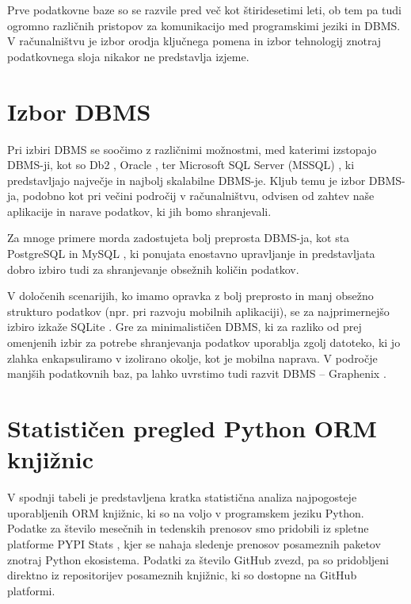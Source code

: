\documentclass[a4paper,12pt,openright]{book}
\begin{document}
    Prve podatkovne baze so se razvile pred več kot štiridesetimi leti, ob tem pa tudi ogromno različnih pristopov za komunikacijo med programskimi jeziki in DBMS. V računalništvu je izbor orodja ključnega pomena in izbor tehnologij znotraj podatkovnega sloja nikakor ne predstavlja izjeme.

    \section{Izbor DBMS}
    Pri izbiri DBMS se soočimo z različnimi možnostmi, med katerimi izstopajo DBMS-ji, kot so Db2 \cite{DB2}, Oracle \cite{ORACLE}, ter Microsoft SQL Server (MSSQL) \cite{MSSQL}, ki predstavljajo največje in najbolj skalabilne DBMS-je. Kljub temu je izbor DBMS-ja, podobno kot pri večini področij v računalništvu, odvisen od zahtev naše aplikacije in narave podatkov, ki jih bomo shranjevali.

    Za mnoge primere morda zadostujeta bolj preprosta DBMS-ja, kot sta PostgreSQL \cite{POSTGRESQL} in MySQL \cite{MYSQL}, ki ponujata enostavno upravljanje in predstavljata dobro izbiro tudi za shranjevanje obsežnih količin podatkov. 
    
    V določenih scenarijih, ko imamo opravka z bolj preprosto in manj obsežno strukturo podatkov (npr. pri razvoju mobilnih aplikaciji), se za najprimernejšo izbiro izkaže SQLite \cite{SQLITE}. Gre za minimalističen DBMS, ki za razliko od prej omenjenih izbir za potrebe shranjevanja podatkov uporablja zgolj datoteko, ki jo zlahka enkapsuliramo v izolirano okolje, kot je mobilna naprava. V področje manjših podatkovnih baz, pa lahko uvrstimo tudi razvit DBMS – Graphenix \cite{GRAPHENIX_GITHUB}.
    
    \section{Statističen pregled Python ORM knjižnic}

    V spodnji tabeli je predstavljena kratka statistična analiza najpogosteje uporabljenih ORM knjižnic, ki so na voljo v programskem jeziku Python. Podatke za število mesečnih in tedenskih prenosov smo pridobili iz spletne platforme PYPI Stats \cite{pypistats}, kjer se nahaja sledenje prenosov posameznih paketov znotraj Python ekosistema. Podatki za število GitHub zvezd, pa so pridobljeni direktno iz repositorijev posameznih knjižnic, ki so dostopne na GitHub platformi.
    
\end{document}
